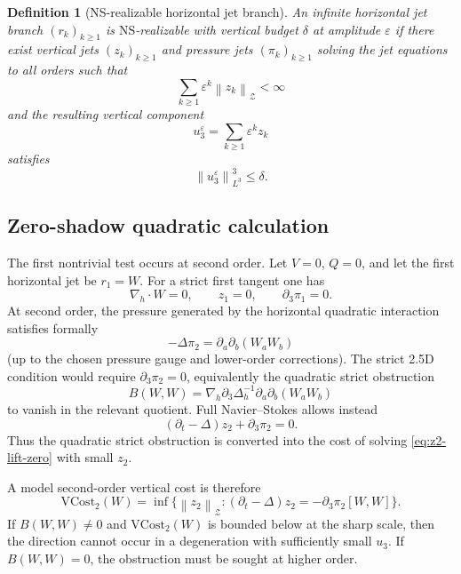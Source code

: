 \documentclass[11pt]{article}
\numberwithin{equation}{section}
\newtheorem{definition}[theorem]{Definition}
\newcommand{\eps}{\varepsilon}
\newcommand{\NS}{\mathrm{NS}}
\newcommand{\nabh}{\nabla_h}
\newcommand{\divh}{\nabla_h\cdot}
\newcommand{\norm}[2]{\left\|#1\right\|_{#2}}
\newcommand{\calZ}{\mathcal Z}
\begin{document}
\begin{definition}[NS-realizable horizontal jet branch]\label{def:NS-realizable-branch}
An infinite horizontal jet branch \((r_k)_{k\ge1}\) is \(\NS\)-realizable with vertical budget \(\delta\) at amplitude \(\eps\) if there exist vertical jets \((z_k)_{k\ge1}\) and pressure jets \((\pi_k)_{k\ge1}\) solving the jet equations to all orders such that
\[
\sum_{k\ge1}\eps^k\norm{z_k}{\calZ}<\infty
\]
and the resulting vertical component
\[
u_3^\eps=\sum_{k\ge1}\eps^kz_k
\]
satisfies
\[
\norm{u_3^\eps}{L^3}^3\le\delta.
\]
\end{definition}

\subsection{Zero-shadow quadratic calculation}

The first nontrivial test occurs at second order.  Let \(V=0\), \(Q=0\), and let the first horizontal jet be \(r_1=W\).  For a strict first tangent one has
\[
\divh W=0,
\qquad
z_1=0,
\qquad
\partial_3\pi_1=0.
\]
At second order, the pressure generated by the horizontal quadratic interaction satisfies formally
\begin{equation}\label{eq:pi2-poisson}
-\Delta \pi_2=\partial_a\partial_b(W_aW_b)
\end{equation}
(up to the chosen pressure gauge and lower-order corrections).  The strict 2.5D condition would require \(\partial_3\pi_2=0\), equivalently the quadratic strict obstruction
\[
B(W,W)=\nabh\partial_3\Delta_h^{-1}\partial_a\partial_b(W_aW_b)
\]
to vanish in the relevant quotient.  Full Navier--Stokes allows instead
\begin{equation}\label{eq:z2-lift-zero}
(\partial_t-\Delta)z_2+\partial_3\pi_2=0.
\end{equation}
Thus the quadratic strict obstruction is converted into the cost of solving \eqref{eq:z2-lift-zero} with small \(z_2\).

A model second-order vertical cost is therefore
\begin{equation}\label{eq:VCost2}
\mathrm{VCost}_2(W)=
\inf\{\norm{z_2}{\calZ}: (\partial_t-\Delta)z_2=-\partial_3\pi_2[W,W]\}.
\end{equation}
If \(B(W,W)\ne0\) and \(\mathrm{VCost}_2(W)\) is bounded below at the sharp scale, then the direction cannot occur in a degeneration with sufficiently small \(u_3\).  If \(B(W,W)=0\), the obstruction must be sought at higher order.
\end{document}
